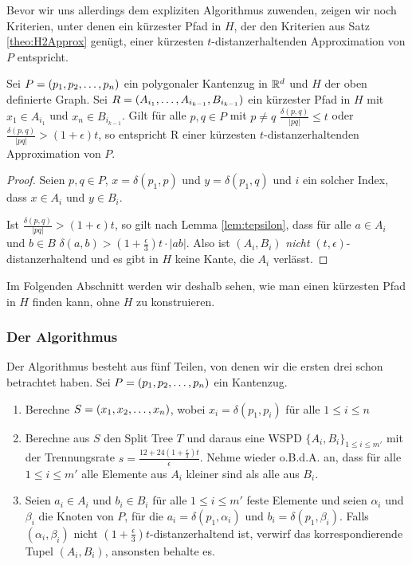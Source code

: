     Bevor wir uns allerdings dem expliziten Algorithmus zuwenden, zeigen wir noch Kriterien, unter denen ein kürzester Pfad in $H$, der den Kriterien aus Satz \ref{theo:H2Approx} genügt, einer kürzesten $t$-distanzerhaltenden Approximation von $P$ entspricht.
    
    \begin{theorem}
    	Sei $P = (p_1, p_2, \mathellipsis, p_n)$ ein polygonaler Kantenzug in $\mathbb{R}^d$ und $H$ der oben definierte Graph. Sei $R = (A_{i_1}, \mathellipsis, A_{i_{k-1}}, B_{i_{k-1}})$ ein kürzester Pfad in $H$ mit $x_1 \in A_{i_1}$ und $x_n \in B_{i_{k-1}}$. Gilt für alle $p, q \in P$ mit $p \neq q$ $\frac{\delta(p, q)}{|pq|} \leq t$ oder $\frac{\delta(p, q)}{|pq|} > (1+\epsilon)t$, so entspricht R einer kürzesten $t$-distanzerhaltenden Approximation von $P$.
    \end{theorem}
    
    \begin{proof}
    	Seien $p, q \in P$, $x = \delta(p_1, p)$ und $y = \delta(p_1, q)$ und $i$ ein solcher Index, dass $x \in A_i$ und $y \in B_i$. 
    	
    	Ist $\frac{\delta(p, q)}{|pq|} > (1+\epsilon)t$, so gilt nach Lemma \ref{lem:tepsilon}, dass für alle $a \in A_i$ und $b \in B$ $\delta(a, b) > (1 + \frac{\epsilon}{3})t \cdot |ab|$. Also ist $(A_i, B_i)$ \emph{nicht} $(t, \epsilon)$-distanzerhaltend und es gibt in $H$ keine Kante, die $A_i$ verlässt.
    \end{proof}
    
    Im Folgenden Abschnitt werden wir deshalb sehen, wie man einen kürzesten Pfad in $H$ finden kann, ohne $H$ zu konstruieren.
    
    \subsubsection*{Der Algorithmus}
    Der Algorithmus besteht aus fünf Teilen, von denen wir die ersten drei schon betrachtet haben.
    Sei $P = (p_1, p_2, \mathellipsis, p_n)$ ein Kantenzug.
    \begin{enumerate}
    	\item Berechne $S = (x_1, x_2, \mathellipsis, x_n)$, wobei $x_i = \delta(p_1, p_i)$ für alle $1 \leq i \leq n$
    	\item Berechne aus $S$ den Split Tree $T$ und daraus eine WSPD $\{A_i, B_i\}_{1 \leq i \leq m'}$ mit der Trennungsrate $s = \frac{12 + 24(1 + \frac{\epsilon}{3})t}{\epsilon}$. Nehme wieder o.B.d.A. an, dass für alle $1 \leq i \leq m'$ alle Elemente aus $A_i$ kleiner sind als alle aus $B_i$.
    	\item Seien $a_i \in A_i$ und $b_i \in B_i$ für alle $1 \leq i \leq m'$ feste Elemente und seien $\alpha_i$ und  $\beta_i$ die Knoten von $P$, für die $a_i = \delta(p_1, \alpha_i)$ und $b_i = \delta(p_1, \beta_i)$. Falls $(\alpha_i, \beta_i)$ nicht $(1+\frac{\epsilon}{3})t$-distanzerhaltend ist, verwirf das korrespondierende Tupel $(A_i, B_i)$, ansonsten behalte es.
    \end{enumerate}
    
